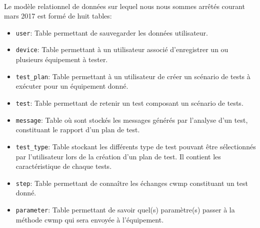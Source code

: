 \documentclass[12pt,a4paper]{report}
\begin{document}
\paragraph*{}Le modèle relationnel de données sur lequel nous nous sommes arrêtés courant mars 2017 est formé de huit tables:
\begin{itemize}
\item \texttt{user}: Table permettant de sauvegarder les données utilisateur.
\item \texttt{device}: Table permettant à un utilisateur associé d'enregistrer un ou plusieurs équipement à tester.
\item \texttt{test\_plan}: Table permettant à un utilisateur de créer un scénario de tests à exécuter pour un équipement donné.
\item \texttt{test}: Table permettant de retenir un test composant un scénario de tests.
\item \texttt{message}: Table où sont stockés les messages générés par l'analyse d'un test, constituant le rapport d'un plan de test.
\item \texttt{test\_type}: Table stockant les différents type de test pouvant être sélectionnés par l'utilisateur lors de la création d'un plan de test. Il contient les caractéristique de chaque tests.
\item \texttt{step}: Table permettant de connaître les échanges \gls{cwmp} constituant un test donné. 
\item \texttt{parameter}: Table permettant de savoir quel(s) paramètre(s) passer à la méthode \gls{cwmp} qui sera envoyée à l'équipement.
\end{itemize}
\end{document}
